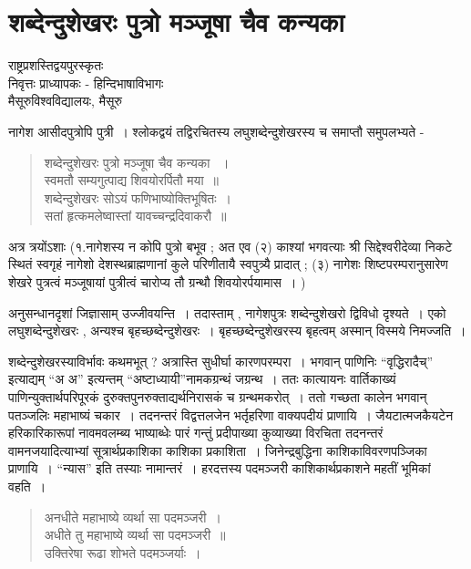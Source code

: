 {\fontsize{15}{17}\selectfont
\presetvalues
\chapter{शब्देन्दुशेखरः पुत्रो मञ्जूषा चैव कन्यका}

\begin{center}
\smallskip

राष्ट्रप्रशस्तिद्वयपुरस्कृतः\\
निवृत्तः प्राध्यापकः - हिन्दिभाषाविभागः\\
मैसूरुविश्वविद्यालयः, मैसूरु
\addrule
\end{center}

नागेश आसीदपुत्रोपि पुत्री~। श्लोकद्वयं तद्विरचितस्य लघुशब्देन्दुशेखरस्य च समाप्तौ समुपलभ्यते -

\begin{verse}
शब्देन्दुशेखरः पुत्रो मञ्जूषा चैव कन्यका ~। \\
स्वमतौ सम्यगुत्पाद्य शिवयोरर्पितौ मया~॥\\
शब्देन्दुशेखरः सोऽयं फणिभाष्योक्तिभूषितः~। \\
सतां हृत्कमलेष्वास्तां यावच्चन्द्रदिवाकरौ~॥
\end{verse}

अत्र त्रयोंऽशाः (१.नागेशस्य न कोपि पुत्रो बभूव ; अत एव (२) काश्यां भगवत्याः श्री सिद्देश्वरीदेव्या निकटे स्थितं स्वगृहं नागेशो देशस्थब्राह्मणानां कुले परिणीतायै स्वपुत्र्यै प्रादात् ; (३) नागेशः शिष्टपरम्परानुसारेण शेखरे पुत्रत्वं मञ्जूषायां पुत्रीत्वं चारोप्य तौ ग्रन्थौ शिवयोरर्पयामास~। )  

अनुसन्धानदृशां जिज्ञासाम् उज्जीवयन्ति~। तदास्ताम् , नागेशपुत्रः शब्देन्दुशेखरो द्विविधो दृश्यते~। एको लघुशब्देन्दुशेखरः , अन्यश्च बृहच्छब्देन्दुशेखरः~। बृहच्छब्देन्दुशेखरस्य बृहत्वम् अस्मान् विस्मये निमज्जति~। 

शब्देन्दुशेखरस्याविर्भावः कथमभूत् ? अत्रास्ति सुधीर्घा कारणपरम्परा~। भगवान् पाणिनिः “वृद्धिरादैच्” इत्याद्यम् “अ अ” इत्यन्तम् “अष्टाध्यायी”नामकग्रन्थं जग्रन्थ~। ततः कात्यायनः वार्तिकाख्यं पाणिन्युक्तार्थपरिपूरकं दुरुक्तपुनरुक्ताद्यर्थनिरासकं च ग्रन्थमकरोत्~। ततो गच्छता कालेन भगवान् पतञ्जलिः महाभाष्यं चकार~। तदनन्तरं विद्वत्तलजेन भर्तृहरिणा वाक्यपदीयं प्राणायि~। जैयटात्मजकैयटेन हरिकारिकारूपां नावमवलम्ब्य भाष्याब्धेः पारं गन्तुं प्रदीपाख्या कुव्याख्या विरचिता तदनन्तरं वामनजयादित्याभ्यां सूत्रार्थप्रकाशिका काशिका प्रकाशिता~। जिनेन्द्रबुद्धिना काशिकाविवरणपञ्जिका प्राणायि~। “न्यास” इति तस्याः नामान्तरं~। हरदत्तस्य पदमञ्जरी काशिकार्थप्रकाशने महतीं भूमिकां वहति~। 

\begin{verse}
अनधीते महाभाष्ये व्यर्था सा पदमञ्जरी~। \\
अधीते तु महाभाष्ये व्यर्था सा पदमञ्जरी~॥\\
उक्तिरेषा रूढा शोभते पदमञ्जर्याः~। 
\end{verse}

}
